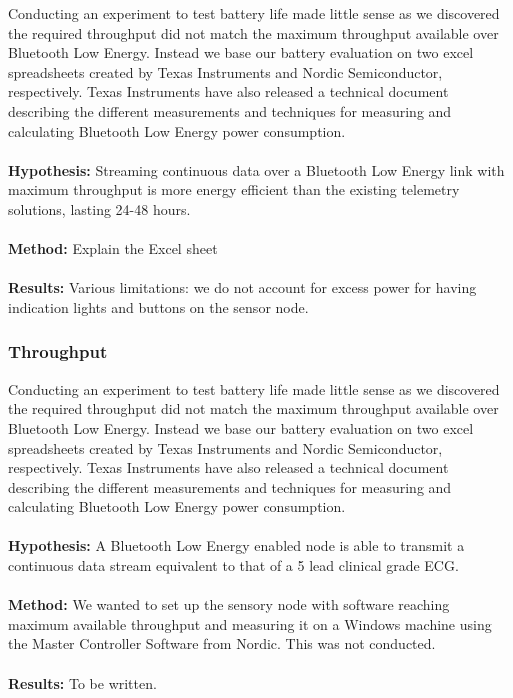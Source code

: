 Conducting an experiment to test battery life made little sense as we discovered the required throughput did not match the maximum throughput available over Bluetooth Low Energy. Instead we base our battery evaluation on two excel spreadsheets created by Texas Instruments and Nordic Semiconductor, respectively. Texas Instruments have also released a technical document \cite{ti_battery_calculations} describing the different measurements and techniques for measuring and calculating Bluetooth Low Energy power consumption.
\\
\\
\noindent %
\textbf{Hypothesis:} Streaming continuous data over a Bluetooth Low Energy link with maximum throughput is more energy efficient than the existing telemetry solutions, lasting 24-48 hours.
\\
\\
\noindent
\textbf{Method:} Explain the Excel sheet
\\
\\
\noindent
\textbf{Results:} Various limitations: we do not account for excess power for having indication lights and buttons on the sensor node.

\subsubsection{Throughput} %
\label{ssub:throughput}

Conducting an experiment to test battery life made little sense as we discovered the required throughput did not match the maximum throughput available over Bluetooth Low Energy. Instead we base our battery evaluation on two excel spreadsheets created by Texas Instruments and Nordic Semiconductor, respectively. Texas Instruments have also released a technical document \cite{ti_battery_calculations} describing the different measurements and techniques for measuring and calculating Bluetooth Low Energy power consumption.
\\
\\
\noindent
\textbf{Hypothesis:} A Bluetooth Low Energy enabled node is able to transmit a continuous data stream equivalent to that of a 5 lead clinical grade ECG.
\\
\\
\noindent
\textbf{Method:} We wanted to set up the sensory node with software reaching maximum available throughput and measuring it on a Windows machine using the Master Controller Software from Nordic. This was not conducted.
\\
\\
\noindent
\textbf{Results:} To be written.



